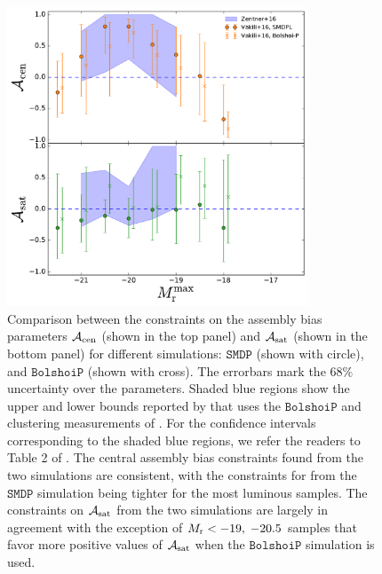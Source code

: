 \documentclass[12pt, preprint]{aastex}
\newcommand{\acen}{\mathcal{A}_{\rm cen}}
\newcommand{\asat}{\mathcal{A}_{\rm sat}}
\begin{document}
\begin{figure}[p]~\\
\begin{center}
\includegraphics[width=0.8\textwidth]{bias_comparison.pdf}
\caption{Comparison between the constraints on the assembly bias parameters $\acen$ (shown in the top panel) and $\asat$ (shown in the bottom panel) for different simulations: $\mathtt{SMDP}$ (shown with circle), and $\mathtt{BolshoiP}$ (shown with cross). The errorbars mark the 68$\%$ uncertainty over the parameters. Shaded blue regions show the upper and lower bounds reported by \citet{zentner2016} that uses the $\mathtt{BolshoiP}$ and clustering measurements of \citet{zehavi2011}. For the confidence intervals corresponding to the shaded blue regions, we refer the readers to Table 2 of \citet{zentner2016}. The central assembly bias constraints found from the two simulations are consistent, with the constraints for from the $\mathtt{SMDP}$ simulation being tighter for the most luminous samples. The constraints on $\asat$ from the two simulations are largely in agreement with the exception of $M_{\rm r}<-19 ,\; -20.5$ samples that favor more positive values of $\asat$ when the $\mathtt{BolshoiP}$ simulation is used.}
\label{fig:bias_comparison}
\end{center}
\end{figure}

\clearpage
\end{document}
